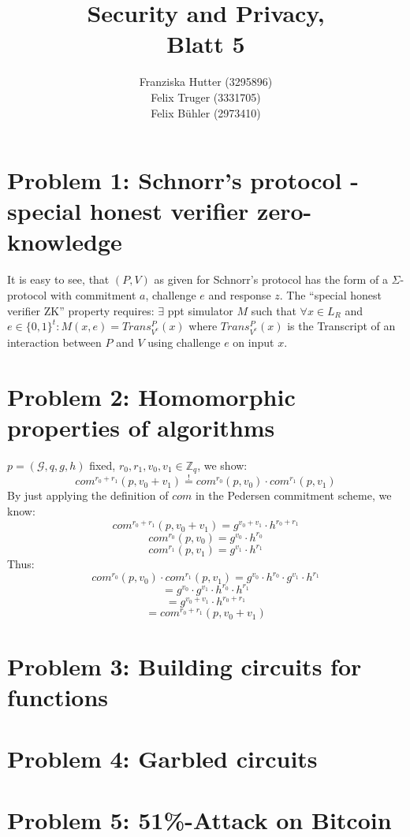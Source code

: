 \documentclass[12pt,pdftex,a4paper]{article}
\title{Security and Privacy,\\ Blatt 5}
\author{Franziska Hutter (3295896)\\
	Felix Truger (3331705)\\
	Felix Bühler (2973410)}
\begin{document}
\maketitle
\pagebreak

\section*{Problem 1: Schnorr’s protocol - special honest verifier zero-knowledge}


It is easy to see, that $(P, V)$ as given for Schnorr’s protocol has the form of a $\Sigma$-protocol with commitment $a$, challenge $e$ and response $z$.
The ``special honest verifier ZK'' property requires: $\exists$ ppt simulator $M$ such that $\forall x\in L_R$ and $e\in \{0,1\}^t: M(x, e) = Trans_{V^e}^P(x)$ where $Trans_{V^e}^P(x)$ is the Transcript of an interaction between $P$ and $V$ using challenge $e$ on input $x$.

\section*{Problem 2: Homomorphic properties of algorithms}
$p=(\mathcal{G},q,g,h)$ fixed, $r_0, r_1, v_0, v_1 \in \mathbb{Z}_q$, we show:
$$com^{r_0+r_1}(p, v_0 + v_1) \overset{!}{=} com^{r_0}(p, v_0) \cdot com^{r_1}(p, v_1)$$
By just applying the definition of $com$ in the Pedersen commitment scheme, we know:
$$com^{r_0+r_1}(p, v_0 + v_1) = g^{v_0 + v_1}\cdot h^{r_0+r_1}$$
$$com^{r_0}(p, v_0) = g^{v_0} \cdot h^{r_0}$$
$$com^{r_1}(p, v_1) = g^{v_1} \cdot h^{r_1}$$
Thus:
$$com^{r_0}(p, v_0) \cdot com^{r_1}(p, v_1) = g^{v_0} \cdot h^{r_0} \cdot g^{v_1} \cdot h^{r_1}$$
$$= g^{v_0}\cdot g^{v_1}\cdot h^{r_0}\cdot h^{r_1}$$
$$= g^{v_0 + v_1}\cdot h^{r_0+r_1}$$
$$= com^{r_0+r_1}(p, v_0 + v_1)$$


\section*{Problem 3: Building circuits for functions}

\section*{Problem 4: Garbled circuits}

\section*{Problem 5: 51\%-Attack on Bitcoin}
\end{document}
